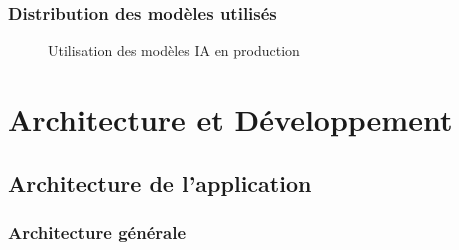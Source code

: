 \documentclass[12pt,a4paper]{report}
\begin{document}
\subsection{Distribution des modèles utilisés}

\begin{figure}[H]
    \centering
    \caption{Utilisation des modèles IA en production}
\end{figure}

\chapter{Architecture et Développement}

\section{Architecture de l'application}

\subsection{Architecture générale}
\end{document}
